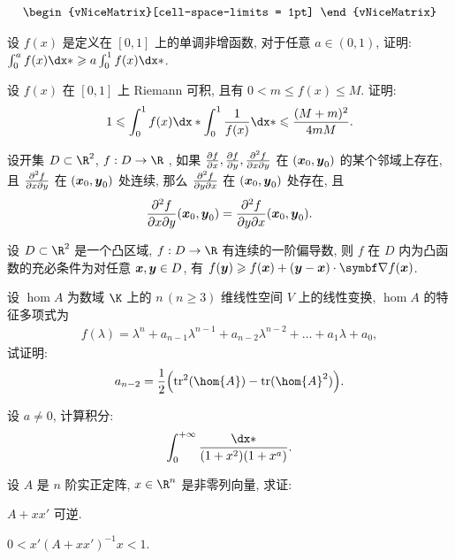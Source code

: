 \begin{exercise}[series=exer]
\begin{align*}
\begin{vNiceMatrix}[cell-space-limits = 1pt]
      \end{vNiceMatrix}
  \end{align*}
  \item 设 $ f(x) $ 是定义在 $ [0, 1] $ 上的单调非增函数, 对于任意 $ a \in (0, 1) $, 证明: $ \int_{0}^{a}f(x) \dx* \ge a\int_{0}^{1}f(x) \dx* $.
  \item 设 $ f(x) $ 在 $ [0, 1] $ 上 Riemann 可积, 且有 $ 0 < m \le f(x) \le M $. 证明:
  \begin{align*}
      1 \le \int_{0}^{1}f(x) \dx* \int_{0}^{1} \frac{1}{f(x)} \dx* \le \frac{(M+m)^{2}}{4mM}.
  \end{align*}
  \item 设开集 $ D\subset \R^{2} $, $ f: D \to \R $ , 如果 $ \pdv{f}{x}, \pdv{f}{y}, \pdv{f}{x}{y} $ 在 $ (\vb*{x}_{0}, \vb*{y}_{0}) $ 的某个邻域上存在, 且 $ \pdv{f}{x}{y} $ 在 $ (\vb*{x}_{0}, \vb*{y}_{0}) $ 处连续, 那么 $ \pdv{f}{y}{x} $ 在 $ (\vb*{x}_{0}, \vb*{y}_{0}) $ 处存在, 且
  \begin{align*}
      \pdv{f}{x}{y}{} (\vb*{x}_{0}, \vb*{y}_{0}) = \pdv{f}{y}{x}{} (\vb*{x}_{0}, \vb*{y}_{0}).
  \end{align*}
  \item 设 $ D \subset \R^{2} $ 是一个凸区域, $ f: D \to \R $ 有连续的一阶偏导数, 则 $ f $ 在 $ D $ 内为凸函数的充必条件为对任意 $ \vb*{x}, \vb*{y}\in D $, 有 $ f(\vb*{y}) \ge f(\vb*{x}) + (\vb*{y} - \vb*{x})\cdot\grad f(\vb*{x}) $.
  \item 设 $ \hom{A} $ 为数域 $ \K $ 上的 $ n\,(n \ge 3) $ 维线性空间 $ V $ 上的线性变换, $ \hom{A} $ 的特征多项式为
  \begin{align*}
      f(\lambda) = \lambda^{n} + a_{n-1}\lambda^{n-1} + a_{n-2}\lambda^{n-2} + \dots + a_{1}\lambda + a_{0},
  \end{align*}
  试证明:
  \begin{align*}
      a_{n - 2} = \frac{1}{2}\qty(\tr^{2}(\hom{A}) - \tr(\hom{A}^{2})).
  \end{align*}
  \item 设 $ a\ne 0 $, 计算积分:
  \begin{align*}
      \int_{0}^{+\infty}\frac{\dx*}{(1+x^{2})(1+x^{a})}.
  \end{align*}
  \item 设 $ A $ 是 $ n $ 阶实正定阵, $ x \in \R^{n} $ 是非零列向量, 求证:
  \begin{exercise}
      \item $ A + xx' $ 可逆.
      \item $ 0 < x'(A+xx')^{-1}x < 1 $.
  \end{exercise}

\end{exercise}

